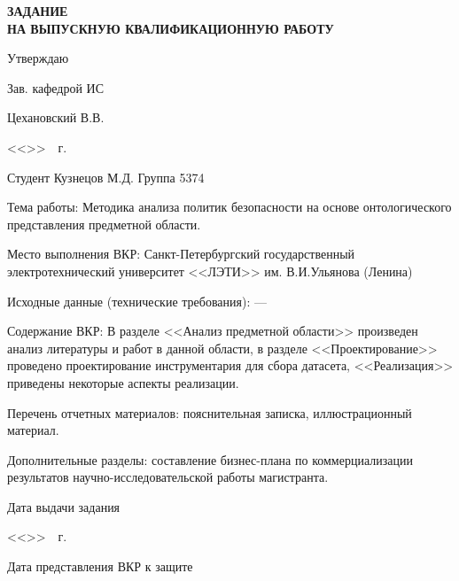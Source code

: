 \documentclass[../main]{subfiles}
\begin{document}
\newpage

\begin{titlepage}
    \centering
        
    \MakeUppercase{\bfseries\large
        задание\\
        на выпускную квалификационную работу
    }

    \vspace{1cm}

    \hfill Утверждаю

    \hfill Зав. кафедрой ИС

    \hfill {} Цехановский В.В.

    \hfill <<\underline{\hspace{1cm}}>>\underline{\hspace{5cm}}~\the\year~г.

    \vspace{1cm}

    \parbox[t]{\textwidth}{
        Студент Кузнецов М.Д. \hfill Группа 5374

        Тема работы: Методика анализа политик безопасности на основе онтологического представления предметной области.

        Место выполнения ВКР: Санкт-Петербургский государственный электротехнический университет 
        <<ЛЭТИ>> им. В.И.Ульянова (Ленина)
        
        Исходные данные (технические требования): ---

        Содержание ВКР: В разделе <<Анализ предметной области>> произведен анализ литературы и работ в данной области, в разделе <<Проектирование>> проведено проектирование инструментария для сбора датасета, <<Реализация>> приведены некоторые аспекты реализации.

        Перечень отчетных материалов: пояснительная записка, иллюстрационный материал.

        Дополнительные разделы: составление бизнес-плана по коммерциализации результатов научно-исследовательской работы магистранта.
    }

    \vfill

    \begin{minipage}[t]{6cm}
        Дата выдачи задания

        <<\underline{\hspace{1cm}}>>\underline{\hspace{3cm}}~\the\year~г.
    \end{minipage}
    \hfill
    \begin{minipage}[t]{8cm}
        Дата представления ВКР к защите


\end{minipage}
\end{titlepage}
\end{document}
